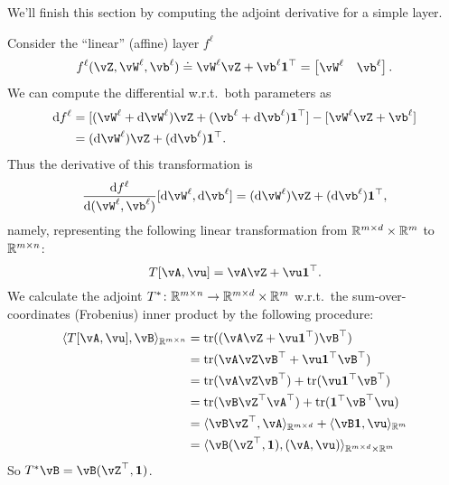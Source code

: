 \documentclass[../../book-main.tex]{subfiles}
\begin{document}
We'll finish this section by computing the adjoint derivative for a simple layer.
\begin{example}
    Consider the ``linear'' (affine) layer \(f^{\ell}\)
    \begin{equation}
        f^{\ell}(\vZ, \vW^{\ell}, \vb^{\ell}) \doteq \vW^{\ell}\vZ + \vb^{\ell}\vone^{\top} = \mat{\vW^{\ell} & \vb^{\ell}}.
    \end{equation}
    We can compute the differential w.r.t.~both parameters as
    \begin{align}
        \odif{f}^{\ell}
        &= [(\vW^{\ell} + \odif{\vW}^{\ell})\vZ + (\vb^{\ell} + \odif{\vb}^{\ell})\vone^{\top}] - [\vW^{\ell}\vZ + \vb^{\ell}] \\ 
        &= (\odif{\vW}^{\ell})\vZ + (\odif{\vb}^{\ell})\vone^{\top}.
    \end{align}
    Thus the derivative of this transformation is 
    \begin{equation}
        \odv{f^{\ell}}{(\vW^{\ell}, \vb^{\ell})}[\odif{\vW}^{\ell}, \odif{\vb}^{\ell}] = (\odif{\vW}^{\ell})\vZ + (\odif{\vb}^{\ell})\vone^{\top},
    \end{equation}
    namely, representing the following linear transformation from \(\mathbb{R}^{m \times d} \times \mathbb{R}^{m}\) to \(\mathbb{R}^{m \times n}\):
    \begin{equation}
        T[\vA, \vu] = \vA\vZ + \vu\vone^{\top}.
    \end{equation}
    We calculate the adjoint \(T^{*} \colon \mathbb{R}^{m \times n} \to \mathbb{R}^{m \times d} \times \mathbb{R}^{m}\) w.r.t.~the sum-over-coordinates (Frobenius) inner product by the following procedure:
    \begin{align}
        \ip{T[\vA, \vu]}{\vB}_{\R^{m \times n}} 
        &= \tr((\vA\vZ + \vu\vone^{\top})\vB^{\top}) \\
        &= \tr(\vA\vZ\vB^{\top} + \vu\vone^{\top}\vB^{\top}) \\
        &= \tr(\vA\vZ\vB^{\top}) + \tr(\vu\vone^{\top}\vB^{\top}) \\
        &= \tr(\vB\vZ^{\top}\vA^{\top}) + \tr(\vone^{\top}\vB^{\top}\vu) \\
        &= \ip{\vB\vZ^{\top}}{\vA}_{\R^{m \times d}} + \ip{\vB\vone}{\vu}_{\R^{m}} \\
        &= \ip{\vB(\vZ^{\top}, \vone)}{(\vA, \vu)}_{\R^{m \times d} \times \R^{m}}
    \end{align}
    So \(T^{*}\vB = \vB(\vZ^{\top}, \vone)\).
\end{example}
\end{document}
